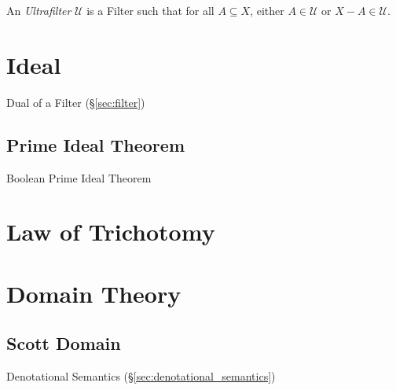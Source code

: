 An \emph{Ultrafilter} $\mathcal{U}$ is a Filter such that for all $A
\subseteq X$, either $A \in \mathcal{U}$ or $X - A \in \mathcal{U}$.



\section{Ideal}\label{sec:order_ideal}

Dual of a Filter (\S\ref{sec:filter})



\subsection{Prime Ideal Theorem}\label{sec:prime_ideal}

Boolean Prime Ideal Theorem



\section{Law of Trichotomy}\label{sec:trichotomy_law}



\section{Domain Theory}\label{sec:domain_theory}

\subsection{Scott Domain}\label{sec:scott_domain}

Denotational Semantics (\S\ref{sec:denotational_semantics})
